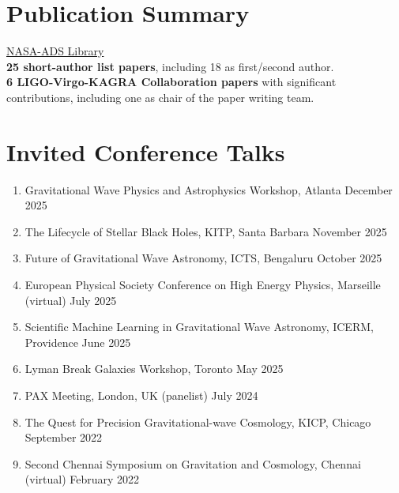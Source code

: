             \section{Publication Summary}
            \href{https://ui.adsabs.harvard.edu/public-libraries/LqJDfKCTTdeuL_Inb7SwVw}{NASA-ADS Library}\\
            \textbf{25 short-author list papers}, including 18 as first/second author.\\
            \textbf{6 LIGO-Virgo-KAGRA Collaboration papers} with significant contributions, including one as chair of the paper writing team.

		
		\section{Invited Conference Talks}
		\begin{enumerate}[leftmargin=*]
			\item Gravitational Wave Physics and Astrophysics Workshop, Atlanta \hfill December 2025
			\item The Lifecycle of Stellar Black Holes, KITP, Santa Barbara \hfill November 2025
			\item Future of Gravitational Wave Astronomy, ICTS, Bengaluru \hfill October 2025
			\item European Physical Society Conference on High Energy Physics, Marseille (virtual) \hfill July 2025
			\item Scientific Machine Learning in Gravitational Wave Astronomy, ICERM, Providence \hfill June 2025
			\item Lyman Break Galaxies Workshop, Toronto \hfill May 2025
			\item PAX Meeting, London, UK (panelist) \hfill July 2024 
			\item The Quest for Precision Gravitational-wave Cosmology, KICP, Chicago \hfill September 2022
			\item {Second Chennai Symposium on Gravitation and Cosmology}, Chennai (virtual) \hfill February 2022

		\end{enumerate}


